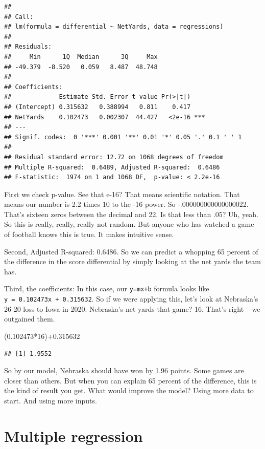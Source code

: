 \documentclass[
]{book}
\newenvironment{Shaded}{\begin{snugshade}}{\end{snugshade}}
\newcommand{\DecValTok}[1]{\textcolor[rgb]{0.00,0.00,0.81}{#1}}
\newcommand{\FloatTok}[1]{\textcolor[rgb]{0.00,0.00,0.81}{#1}}
\newcommand{\NormalTok}[1]{#1}
\newcommand{\SpecialCharTok}[1]{\textcolor[rgb]{0.00,0.00,0.00}{#1}}
\begin{document}
\begin{verbatim}
## 
## Call:
## lm(formula = differential ~ NetYards, data = regressions)
## 
## Residuals:
##     Min      1Q  Median      3Q     Max 
## -49.379  -8.520   0.059   8.487  48.748 
## 
## Coefficients:
##             Estimate Std. Error t value Pr(>|t|)    
## (Intercept) 0.315632   0.388994   0.811    0.417    
## NetYards    0.102473   0.002307  44.427   <2e-16 ***
## ---
## Signif. codes:  0 '***' 0.001 '**' 0.01 '*' 0.05 '.' 0.1 ' ' 1
## 
## Residual standard error: 12.72 on 1068 degrees of freedom
## Multiple R-squared:  0.6489, Adjusted R-squared:  0.6486 
## F-statistic:  1974 on 1 and 1068 DF,  p-value: < 2.2e-16
\end{verbatim}

First we check p-value. See that e-16? That means scientific notation. That means our number is 2.2 times 10 to the -16 power. So -.000000000000000022. That's sixteen zeros between the decimal and 22. Is that less than .05? Uh, yeah. So this is really, really, really not random. But anyone who has watched a game of football knows this is true. It makes intuitive sense.

Second, Adjusted R-squared: 0.6486. So we can predict a whopping 65 percent of the difference in the score differential by simply looking at the net yards the team has.

Third, the coefficients: In this case, our \texttt{y=mx+b} formula looks like \texttt{y\ =\ 0.102473x\ +\ 0.315632}. So if we were applying this, let's look at Nebraska's 26-20 loss to Iowa in 2020. Nebraska's net yards that game? 16. That's right -- we outgained them.

\begin{Shaded}
\begin{Highlighting}[]
\NormalTok{(}\FloatTok{0.102473}\SpecialCharTok{*}\DecValTok{16}\NormalTok{)}\SpecialCharTok{+}\FloatTok{0.315632} 
\end{Highlighting}
\end{Shaded}

\begin{verbatim}
## [1] 1.9552
\end{verbatim}

So by our model, Nebraska should have won by 1.96 points. Some games are closer than others. But when you can explain 65 percent of the difference, this is the kind of result you get. What would improve the model? Using more data to start. And using more inputs.

\hypertarget{multiple-regression}{%
\chapter{Multiple regression}\label{multiple-regression}}
\end{document}
